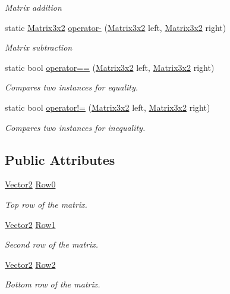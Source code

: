 \begin{DoxyCompactItemize}
\begin{DoxyCompactList}\small\item\em Matrix addition \end{DoxyCompactList}\item 
static \hyperlink{struct_open_t_k_1_1_matrix3x2}{Matrix3x2} \hyperlink{struct_open_t_k_1_1_matrix3x2_aeef03a5c3d3955c0f04d060cc5689deb}{operator-\/} (\hyperlink{struct_open_t_k_1_1_matrix3x2}{Matrix3x2} left, \hyperlink{struct_open_t_k_1_1_matrix3x2}{Matrix3x2} right)
\begin{DoxyCompactList}\small\item\em Matrix subtraction \end{DoxyCompactList}\item 
static bool \hyperlink{struct_open_t_k_1_1_matrix3x2_a53a224d1d1a38bb1c8453a9e09243913}{operator==} (\hyperlink{struct_open_t_k_1_1_matrix3x2}{Matrix3x2} left, \hyperlink{struct_open_t_k_1_1_matrix3x2}{Matrix3x2} right)
\begin{DoxyCompactList}\small\item\em Compares two instances for equality. \end{DoxyCompactList}\item 
static bool \hyperlink{struct_open_t_k_1_1_matrix3x2_a51bf28290235801dba381e96a0afabdf}{operator!=} (\hyperlink{struct_open_t_k_1_1_matrix3x2}{Matrix3x2} left, \hyperlink{struct_open_t_k_1_1_matrix3x2}{Matrix3x2} right)
\begin{DoxyCompactList}\small\item\em Compares two instances for inequality. \end{DoxyCompactList}\end{DoxyCompactItemize}
\subsection*{Public Attributes}
\begin{DoxyCompactItemize}
\item 
\hyperlink{struct_open_t_k_1_1_vector2}{Vector2} \hyperlink{struct_open_t_k_1_1_matrix3x2_a3883e734401ea264fa2770963235fc52}{Row0}
\begin{DoxyCompactList}\small\item\em Top row of the matrix. \end{DoxyCompactList}\item 
\hyperlink{struct_open_t_k_1_1_vector2}{Vector2} \hyperlink{struct_open_t_k_1_1_matrix3x2_a19ab32dcace66a7bac73ad53fdc94b2a}{Row1}
\begin{DoxyCompactList}\small\item\em Second row of the matrix. \end{DoxyCompactList}\item 
\hyperlink{struct_open_t_k_1_1_vector2}{Vector2} \hyperlink{struct_open_t_k_1_1_matrix3x2_a08ee98f785c2540cdea103c513c4afe4}{Row2}
\begin{DoxyCompactList}\small\item\em Bottom row of the matrix. \end{DoxyCompactList}\end{DoxyCompactItemize}

